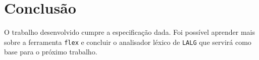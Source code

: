 \section{Conclusão \label{sec:conclusao}}

O trabalho desenvolvido cumpre a especificação dada. Foi possível aprender mais sobre a ferramenta \texttt{flex} e concluir o analisador léxico de \texttt{LALG} que servirá como base para o próximo trabalho.
